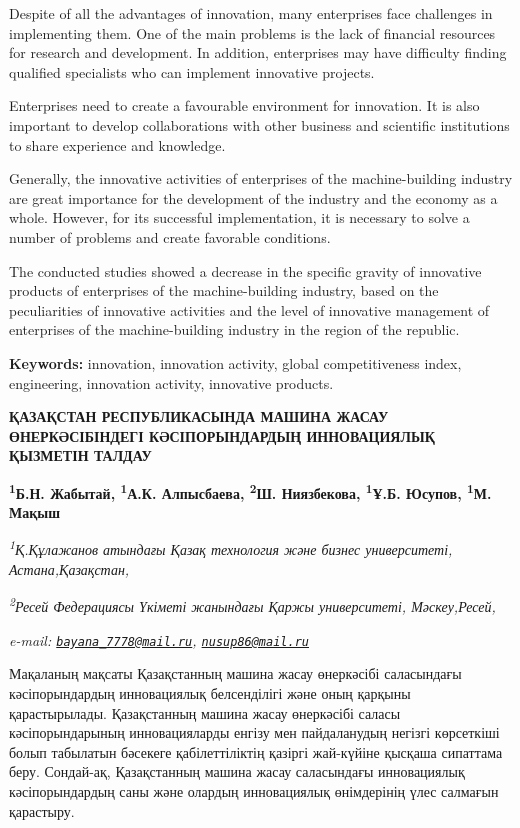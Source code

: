 Despite of all the advantages of innovation, many enterprises face
challenges in implementing them. One of the main problems is the lack of
financial resources for research and development. In addition,
enterprises may have difficulty finding qualified specialists who can
implement innovative projects.

Enterprises need to create a favourable environment for innovation. It
is also important to develop collaborations with other business and
scientific institutions to share experience and knowledge.

Generally, the innovative activities of enterprises of the
machine-building industry are great importance for the development of
the industry and the economy as a whole. However, for its successful
implementation, it is necessary to solve a number of problems and create
favorable conditions.

The conducted studies showed a decrease in the specific gravity of
innovative products of enterprises of the machine-building industry,
based on the peculiarities of innovative activities and the level of
innovative management of enterprises of the machine-building industry in
the region of the republic.

{\bfseries Keywords:} innovation, innovation activity, global
competitiveness index, engineering, innovation activity, innovative
products.

\begin{articleheader}
{\bfseries ҚАЗАҚСТАН РЕСПУБЛИКАСЫНДА МАШИНА ЖАСАУ ӨНЕРКӘСІБІНДЕГІ КӘСІПОРЫНДАРДЫҢ ИННОВАЦИЯЛЫҚ ҚЫЗМЕТІН ТАЛДАУ}

{\bfseries
\textsuperscript{1}Б.Н. Жабытай\textsuperscript{\envelope },
\textsuperscript{1}А.К. Алпысбаева,
\textsuperscript{2}Ш. Ниязбекова,
\textsuperscript{1}Ұ.Б. Юсупов\textsuperscript{\envelope },
\textsuperscript{1}М. Мақыш}
\end{articleheader}

\begin{affiliation}
\emph{\textsuperscript{1}Қ.Құлажанов атындағы Қазақ технология және бизнес университеті, Астана,Қазақстан,}

\emph{\textsuperscript{2}Ресей Федерациясы Үкіметі жанындағы Қаржы университеті, Мәскеу,Ресей,}

\emph{e-mail: \href{mailto:bayana_7778@mail.ru}{\nolinkurl{bayana\_7778@mail.ru}}, \href{mailto:nusup86@mail.ru}{\nolinkurl{nusup86@mail.ru}}}
\end{affiliation}

Мақаланың мақсаты Қазақстанның машина жасау өнеркәсібі саласындағы
кәсіпорындардың инновациялық белсенділігі және оның қарқыны
қарастырылады. Қазақстанның машина жасау өнеркәсібі саласы
кәсіпорындарының инновацияларды енгізу мен пайдаланудың негізгі
көрсеткіші болып табылатын бәсекеге қабілеттіліктің қазіргі жай-күйіне
қысқаша сипаттама беру. Сондай-ақ, Қазақстанның машина жасау саласындағы
инновациялық кәсіпорындардың саны және олардың инновациялық өнімдерінің
үлес салмағын қарастыру.

